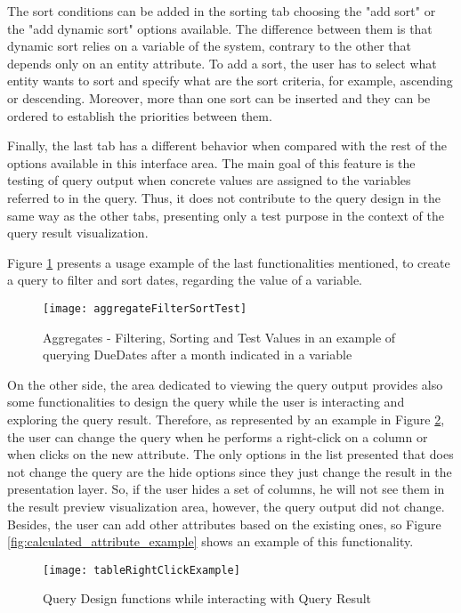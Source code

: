 The sort conditions can be added in the sorting tab choosing the "add sort" or the "add dynamic sort" options available. The difference between them is that dynamic sort relies on a variable of the system, contrary to the other that depends only on an entity attribute. To add a sort, the user has to select what entity wants to sort and specify what are the sort criteria, for example, ascending or descending. Moreover, more than one sort can be inserted and they can be ordered to establish the priorities between them.

Finally, the last tab has a different behavior when compared with the rest of the options available in this interface area. The main goal of this feature is the testing of query output when concrete values are assigned to the variables referred to in the query. Thus, it does not contribute to the query design in the same way as the other tabs, presenting only a test purpose in the context of the query result visualization.

Figure \ref{fig:aggregates_filter_sort_test} presents a usage example of the last functionalities mentioned, to create a query to filter and sort dates, regarding the value of a variable.

\begin{figure}[tb]
	\centering
	\texttt{[image: aggregateFilterSortTest]}
	\caption{Aggregates - Filtering, Sorting and Test Values in an example of querying DueDates after a month indicated in a variable}
	\label{fig:aggregates_filter_sort_test}
\end{figure}

On the other side, the area dedicated to viewing the query output provides also some functionalities to design the query while the user is interacting and exploring the query result. Therefore, as represented by an example in Figure \ref{fig:table_right_click_example}, the user can change the query when he performs a right-click on a column or when clicks on the new attribute. The only options in the list presented that does not change the query are the hide options since they just change the result in the presentation layer. So, if the user hides a set of columns, he will not see them in the result preview visualization area, however, the query output did not change. Besides, the user can add other attributes based on the existing ones, so Figure \ref{fig:calculated_attribute_example} shows an example of this functionality.

\begin{figure}[tb]
	\centering
	\texttt{[image: tableRightClickExample]}
	\caption{Query Design functions while interacting with Query Result}
	\label{fig:table_right_click_example}
\end{figure}

